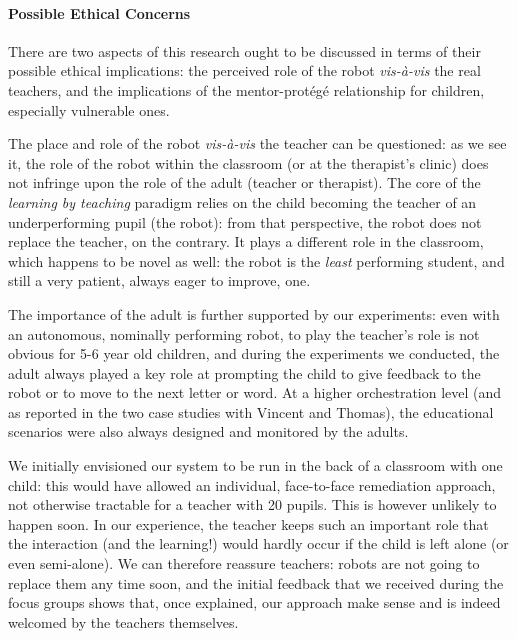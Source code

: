 \documentclass{article}
\begin{document}
\paragraph{Possible Ethical Concerns} There are two aspects of this research ought to be
discussed in terms of their possible ethical implications: the perceived role of
the robot \textit{vis-à-vis} the real teachers, and the implications of the
mentor-protégé relationship for children, especially vulnerable ones.

The place and role of the robot \textit{vis-à-vis} the teacher can be
questioned: as we see it, the role of the robot within the classroom (or at the
therapist's clinic) does not infringe upon the role of the adult (teacher or
therapist). The core of the \emph{learning by teaching} paradigm relies on the
child becoming the teacher of an underperforming pupil (the robot): from that
perspective, the robot does not replace the teacher, on the contrary. It plays a
different role in the classroom, which happens to be novel as well: the robot is
the \emph{least} performing student, and still a very patient, always eager to
improve, one.

The importance of the adult is further supported by our experiments: even with
an autonomous, nominally performing robot, to play the teacher's role is
not obvious for 5-6 year old children, and during the experiments we conducted,
the adult always played a key role at prompting the child to give feedback to
the robot or to move to the next letter or word.  At a higher orchestration
level (and as reported in the two case studies with Vincent and Thomas), the
educational scenarios were also always designed and monitored by the adults.

We initially envisioned our system to be run in the back of a classroom with one
child: this would have allowed an individual, face-to-face remediation approach,
not otherwise tractable for a teacher with 20 pupils.  This is however unlikely
to happen soon. In our experience, the teacher keeps such an important role that
the interaction (and the learning!) would hardly occur if the child is left
alone (or even semi-alone). We can therefore reassure teachers: robots are not
going to replace them any time soon, and the initial feedback that we received
during the focus groups shows that, once explained, our approach make sense and
is indeed welcomed by the teachers themselves.
\end{document}
